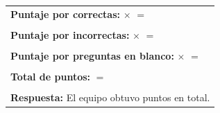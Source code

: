 \documentclass[12pt, letterpaper]{article}
\newcommand{\boxfill}[1][1.5cm]{\tcbox[on line, size=minimal, colframe=valdark!60, colback=boxbg, boxrule=0.8pt, arc=1mm, boxsep=3pt, left=2pt, right=2pt, top=2pt, bottom=2pt]{\makebox[#1]{\vphantom{M}}}}
\begin{document}
	\vspace{0.7cm}
	\begin{center}
		\begin{tabular}{l}
			\textbf{Puntaje por correctas:} \boxfill[0.8cm] $\times$ \boxfill[0.8cm] $=$ \boxfill[2cm]\\\\
				
			\textbf{Puntaje por incorrectas:} \boxfill[0.8cm] $\times$ \boxfill[0.8cm] $=$ \boxfill[2cm] \\\\
			
			\textbf{Puntaje por preguntas en blanco:} \boxfill[0.8cm] $\times$ \boxfill[0.8cm] $=$ \boxfill[2cm] \\\\
			
			\textbf{Total de puntos:} \boxfill[7cm] $=$ \boxfill[2cm] \\\\
			
			\textbf{Respuesta:} El equipo obtuvo \boxfill[2cm] puntos en total.
		\end{tabular}
	\end{center}
	
	
	
\end{document}
